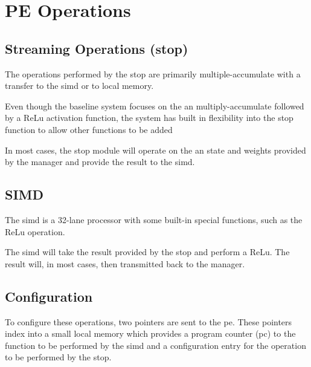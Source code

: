 \iffalse
\section{PE Operations}
\label{sec:PE Operations}

\subsection{Streaming Operations (\ac{stop})}
\label{sec:streamingOps}
The operations performed by the \ac{stop} are primarily multiple-accumulate with a transfer to the \ac{simd} or to local memory.

Even though the baseline system focuses on the \ac{an} multiply-accumulate followed by a ReLu activation function, the system has built in flexibility into the \ac{stop} function to allow other functions to be added

In most cases, the \ac{stop} module will operate on the \ac{an} state and weights provided by the manager and provide the result to the \ac{simd}.
\subsection{SIMD}
\label{sec:SIMD}

The \ac{simd} is a 32-lane processor with some built-in special functions, such as the ReLu operation.

The \ac{simd} will take the result provided by the \ac{stop} and perform a ReLu. The result will, in most cases, then transmitted back to the manager.

\subsection{Configuration}
\label{sec:peConfiguration}

To configure these operations, two pointers are sent to the \ac{pe}. These pointers index into a small local memory which provides a program counter (\ac{pc}) to the function to be performed by the \ac{simd} and a configuration entry for the operation to be performed by the \ac{stop}.

